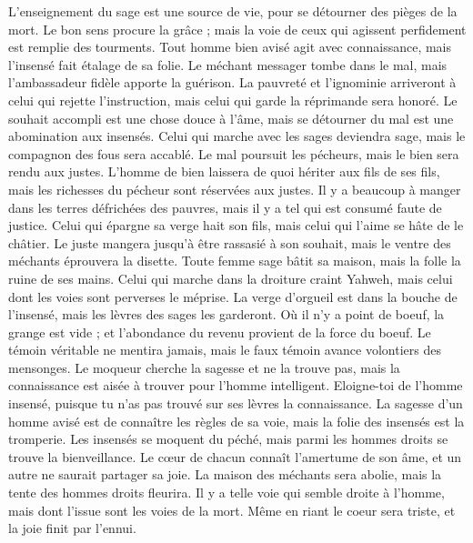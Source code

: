 \begin{multicols}{2}
L'enseignement du sage est une source de vie, pour se détourner des pièges de la mort.
Le bon sens procure la grâce ; mais la voie de ceux qui agissent perfidement est remplie des tourments.
Tout homme bien avisé agit avec connaissance, mais l’insensé fait étalage de sa folie.
Le méchant messager tombe dans le mal, mais l'ambassadeur fidèle apporte la guérison.
La pauvreté et l'ignominie arriveront à celui qui rejette l'instruction, mais celui qui garde la réprimande sera honoré.
Le souhait accompli est une chose douce à l'âme, mais se détourner du mal est une abomination aux insensés.
Celui qui marche avec les sages deviendra sage, mais le compagnon des fous sera accablé.
Le mal poursuit les pécheurs, mais le bien sera rendu aux justes.
L'homme de bien laissera de quoi hériter aux fils de ses fils, mais les richesses du pécheur sont réservées aux justes.
Il y a beaucoup à manger dans les terres défrichées des pauvres, mais il y a tel qui est consumé faute de justice.
Celui qui épargne sa verge hait son fils, mais celui qui l'aime se hâte de le châtier.
Le juste mangera jusqu'à être rassasié à son souhait, mais le ventre des méchants éprouvera la disette.
\VerseOne{}Toute femme sage bâtit sa maison, mais la folle la ruine de ses mains.
Celui qui marche dans la droiture craint Yahweh, mais celui dont les voies sont perverses le méprise.
La verge d'orgueil est dans la bouche de l’insensé, mais les lèvres des sages les garderont.
Où il n'y a point de boeuf, la grange est vide ; et l'abondance du revenu provient de la force du boeuf.
Le témoin véritable ne mentira jamais, mais le faux témoin avance volontiers des mensonges.
Le moqueur cherche la sagesse et ne la trouve pas, mais la connaissance est aisée à trouver pour l'homme intelligent.
Eloigne-toi de l'homme insensé, puisque tu n’as pas trouvé sur ses lèvres la connaissance.
La sagesse d’un homme avisé est de connaître les règles de sa voie, mais la folie des insensés est la tromperie.
Les insensés se moquent du péché, mais parmi les hommes droits se trouve la bienveillance.
Le cœur de chacun connaît l'amertume de son âme, et un autre ne saurait partager sa joie.
La maison des méchants sera abolie, mais la tente des hommes droits fleurira.
Il y a telle voie qui semble droite à l'homme, mais dont l'issue sont les voies de la mort.
Même en riant le coeur sera triste, et la joie finit par l'ennui.

\end{multicols}
